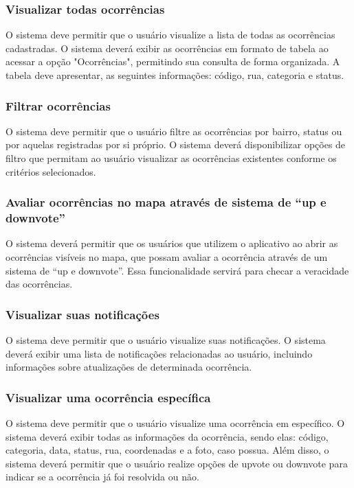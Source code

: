 \subsubsection{Visualizar todas ocorrências}

O sistema deve permitir que o usuário visualize a lista de todas as ocorrências cadastradas. O sistema deverá exibir as ocorrências em formato de tabela ao acessar a opção "Ocorrências", permitindo sua consulta de forma organizada. A tabela deve apresentar, as seguintes informações: código, rua, categoria e status.

\subsubsection{Filtrar ocorrências} 

O sistema deve permitir que o usuário filtre as ocorrências por bairro, status ou por aquelas registradas por si próprio. O sistema deverá disponibilizar opções de filtro que permitam ao usuário visualizar as ocorrências existentes conforme os critérios selecionados.

\subsubsection{Avaliar ocorrências no mapa através de sistema de “up e downvote”}

O sistema deverá permitir que os usuários que utilizem o aplicativo ao abrir as ocorrências visíveis no mapa, que possam avaliar a ocorrência através de um sistema de “up e downvote”. Essa funcionalidade servirá para checar a veracidade das ocorrências.

\subsubsection{Visualizar suas notificações}

O sistema deve permitir que o usuário visualize suas notificações. O sistema deverá exibir uma lista de notificações relacionadas ao usuário, incluindo informações sobre atualizações de determinada ocorrência.

\subsubsection{Visualizar uma ocorrência específica}

O sistema deve permitir que o usuário visualize uma ocorrência em específico. O sistema deverá exibir todas as informações da ocorrência, sendo elas: código, categoria, data, status, rua, coordenadas e a foto, caso possua. Além disso, o sistema deverá permitir que o usuário realize opções de upvote ou downvote para indicar se a ocorrência já foi resolvida ou não.

